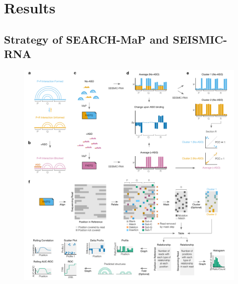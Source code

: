 \documentclass[main.tex]{subfiles}
\begin{document}
\section{Results}
\label{results}


\subsection{Strategy of SEARCH-MaP and SEISMIC-RNA}


\begin{figure}[H]
	\includegraphics[width=\textwidth]{../MainFigures/strategy/strategy.pdf}

\end{figure}
\end{document}
